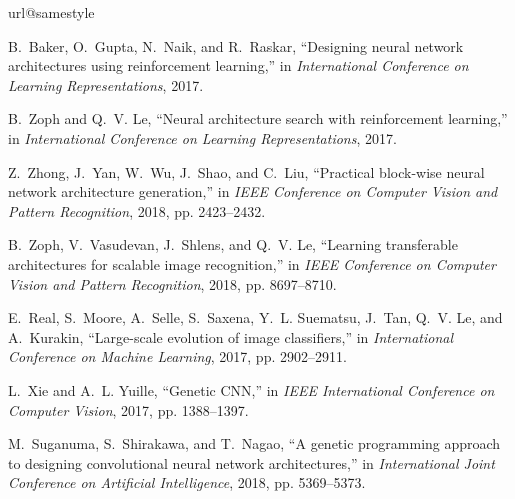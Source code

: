 \documentclass[journal]{IEEEtran}
\begin{document}
\begin{thebibliography}{10}
\providecommand{\url}[1]{#1}
\csname url@samestyle\endcsname
\providecommand{\newblock}{\relax}
\providecommand{\bibinfo}[2]{#2}
\providecommand{\BIBentrySTDinterwordspacing}{\spaceskip=0pt\relax}
\providecommand{\BIBentryALTinterwordstretchfactor}{4}
\providecommand{\BIBentryALTinterwordspacing}{\spaceskip=\fontdimen2\font plus
\BIBentryALTinterwordstretchfactor\fontdimen3\font minus
  \fontdimen4\font\relax}
\providecommand{\BIBforeignlanguage}[2]{{\expandafter\ifx\csname l@#1\endcsname\relax
\typeout{** WARNING: IEEEtran.bst: No hyphenation pattern has been}\typeout{** loaded for the language `#1'. Using the pattern for}\typeout{** the default language instead.}\else
\language=\csname l@#1\endcsname
\fi
#2}}
\providecommand{\BIBdecl}{\relax}
\BIBdecl

B.~Baker, O.~Gupta, N.~Naik, and R.~Raskar, ``Designing neural network
  architectures using reinforcement learning,'' in \emph{International
  Conference on Learning Representations}, 2017.

B.~Zoph and Q.~V. Le, ``Neural architecture search with reinforcement
  learning,'' in \emph{International Conference on Learning Representations},
  2017.

Z.~Zhong, J.~Yan, W.~Wu, J.~Shao, and C.~Liu, ``Practical block-wise neural
  network architecture generation,'' in \emph{IEEE Conference on Computer
  Vision and Pattern Recognition}, 2018, pp. 2423--2432.

B.~Zoph, V.~Vasudevan, J.~Shlens, and Q.~V. Le, ``Learning transferable
  architectures for scalable image recognition,'' in \emph{IEEE Conference on
  Computer Vision and Pattern Recognition}, 2018, pp. 8697--8710.

E.~Real, S.~Moore, A.~Selle, S.~Saxena, Y.~L. Suematsu, J.~Tan, Q.~V. Le, and
  A.~Kurakin, ``Large-scale evolution of image classifiers,'' in
  \emph{International Conference on Machine Learning}, 2017, pp. 2902--2911.

L.~Xie and A.~L. Yuille, ``Genetic {CNN},'' in \emph{IEEE International
  Conference on Computer Vision}, 2017, pp. 1388--1397.

M.~Suganuma, S.~Shirakawa, and T.~Nagao, ``A genetic programming approach to
  designing convolutional neural network architectures,'' in
  \emph{International Joint Conference on Artificial Intelligence}, 2018, pp.
  5369--5373.


\end{thebibliography}
\end{document}
